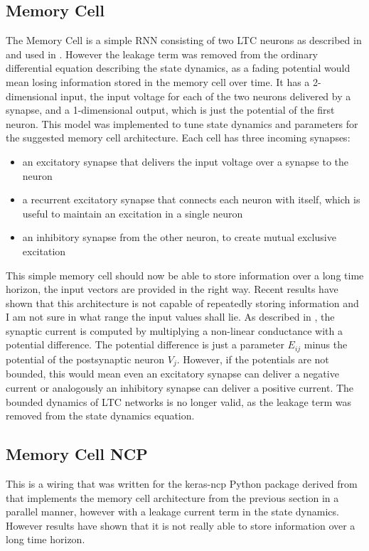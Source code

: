 \documentclass[draft,final]{vutinfth} %
\begin{document}
    \subsection{Memory Cell} \label{Memory Cell}
    The Memory Cell is a simple RNN consisting of two LTC neurons as described in \cite{LTCNetworks} and used in \cite{NCP}.
    However the leakage term was removed from the ordinary differential equation describing the state dynamics, as a fading potential would mean losing information stored in the memory cell over time.
    It has a 2-dimensional input, the input voltage for each of the two neurons delivered by a synapse, and a 1-dimensional output, which is just the potential of the first neuron.
    This model was implemented to tune state dynamics and parameters for the suggested memory cell architecture.
    Each cell has three incoming synapses:
    \begin{itemize}
        \item{}
        an excitatory synapse that delivers the input voltage over a synapse to the neuron
        \item{}
        a recurrent excitatory synapse that connects each neuron with itself, which is useful to maintain an excitation in a single neuron
        \item{}
        an inhibitory synapse from the other neuron, to create mutual exclusive excitation
    \end{itemize}
    This simple memory cell should now be able to store information over a long time horizon, the input vectors are provided in the right way.
    Recent results have shown that this architecture is not capable of repeatedly storing information and I am not sure in what range the input values shall lie.
    As described in \cite{LTCNetworks}, the synaptic current is computed by multiplying a non-linear conductance with a potential difference.
    The potential difference is just a parameter $E_{ij}$ minus the potential of the postsynaptic neuron $V_j$.
    However, if the potentials are not bounded, this would mean even an excitatory synapse can deliver a negative current or analogously an inhibitory synapse can deliver a positive current.
    The bounded dynamics of LTC networks is no longer valid, as the leakage term was removed from the state dynamics equation.

    \subsection{Memory Cell NCP} \label{Memory Cell NCP}
    This is a wiring that was written for the keras-ncp Python package derived from \cite{NCP} that implements the memory cell architecture from the previous section in a parallel manner, however with a leakage current term in the state dynamics.
    However results have shown that it is not really able to store information over a long time horizon.
\end{document}
